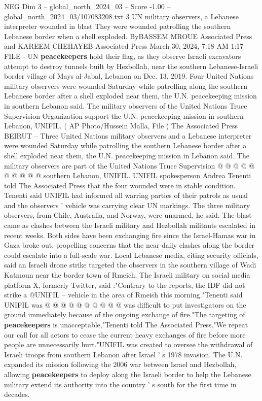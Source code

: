 \begin{textsample}{NEG Dim 3 – global\_north\_2024\_03 – Score -1.00 – global\_north\_2024\_03/107083208.txt}  \label{ex:f3_neg_161}
3 UN military observers, a Lebanese interpreter wounded in blast They were wounded patrolling the southern Lebanese border when a shell exploded.
ByBASSEM MROUE Associated Press and KAREEM CHEHAYEB Associated Press March 30, 2024, 7:18 AM 1:17 FILE - UN \textbf{peacekeepers} hold their flag, as they observe Israeli excavators attempt to destroy tunnels built by Hezbollah, near the southern Lebanese-Israeli border village of Mays al-Jabal, Lebanon on Dec. 13, 2019.
Four United Nations military observers were wounded Saturday while patrolling along the southern Lebanese border after a shell exploded near them, the U.N. peacekeeping mission in southern Lebanon said.
The military observers of the United Nations Truce Supervision Organization support the U.N. peacekeeping mission in southern Lebanon, UNIFIL. ( AP Photo/Hussein Malla, File ) The Associated Press BEIRUT -- Three United Nations military observers and a Lebanese interpreter were wounded Saturday while patrolling the southern Lebanese border after a shell exploded near them, the U.N. peacekeeping mission in Lebanon said.
The military observers are part of the United Nations Truce Supervision @ @ @ @ @ @ @ @ @ @ southern Lebanon, UNIFIL.
UNIFIL spokesperson Andrea Tenenti told The Associated Press that the four wounded were in stable condition.
Tenenti said UNIFIL had informed all warring parties of their patrols as usual and the observers ' vehicle was carrying clear UN markings.
The three military observers, from Chile, Australia, and Norway, were unarmed, he said.
The blast came as clashes between the Israeli military and Hezbollah militants escalated in recent weeks.
Both sides have been exchanging fire since the Israel-Hamas war in Gaza broke out, propelling concerns that the near-daily clashes along the border could escalate into a full-scale war.
Local Lebanese media, citing security officials, said an Israeli drone strike targeted the observers in the southern village of Wadi Katmoun near the border town of Rmeich.
The Israeli military on social media platform X, formerly Twitter, said :"Contrary to the reports, the IDF did not strike a @UNIFIL -- vehicle in the area of Rmeish this morning."Tenenti said UNIFIL was @ @ @ @ @ @ @ @ @ @ was difficult to put investigators on the ground immediately because of the ongoing exchange of fire."The targeting of \textbf{peacekeepers} is unacceptable,"Tenenti told The Associated Press."We repeat our call for all actors to cease the current heavy exchanges of fire before more people are unnecessarily hurt."UNIFIL was created to oversee the withdrawal of Israeli troops from southern Lebanon after Israel ' s 1978 invasion.
The U.N. expanded its mission following the 2006 war between Israel and Hezbollah, allowing \textbf{peacekeepers} to deploy along the Israeli border to help the Lebanese military extend its authority into the country ' s south for the first time in decades.

\end{textsample}
